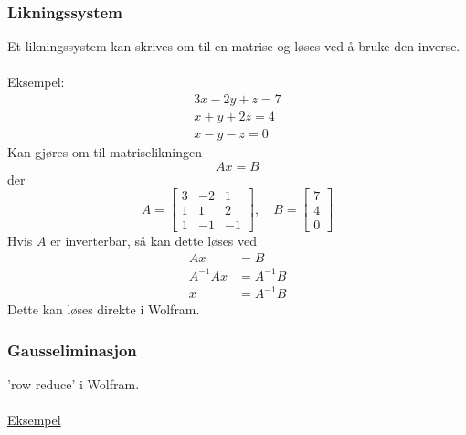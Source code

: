 \documentclass{article}
\begin{document}
\subsubsection{Likningssystem}
Et likningssystem kan skrives om til en matrise og løses ved å bruke den inverse.
\\\\
Eksempel:
\begin{gather*}
    3x - 2y + z = 7 \\
    x + y + 2z = 4 \\
    x - y - z = 0
\end{gather*}
Kan gjøres om til matriselikningen
\[ Ax = B \]
der
\[ A = \begin{bmatrix}
    3 & -2 & 1 \\
    1 & 1 & 2 \\
    1 & -1 & -1
\end{bmatrix}, \quad
B = \begin{bmatrix}
    7 \\ 4 \\ 0
\end{bmatrix}\]
Hvis $A$ er inverterbar, så kan dette løses ved
\begin{align*}
    Ax &= B \\
    A^{-1}Ax &= A^{-1}B \\
    x & = A^{-1}B
\end{align*}
Dette kan løses direkte i Wolfram.

\subsubsection{Gausseliminasjon}
'row reduce' i Wolfram.
\\\\
\href{https://www.wolframalpha.com/input/?i=row+reduce+\%7B\%7B1\%2C+1\%2C+4\%2C+0\%7D\%2C+\%7B1\%2C+2\%2C+6\%2C+1\%7D\%2C+\%7B0\%2C+3\%2C+6\%2C+3\%7D\%7D}{Eksempel}
\end{document}
